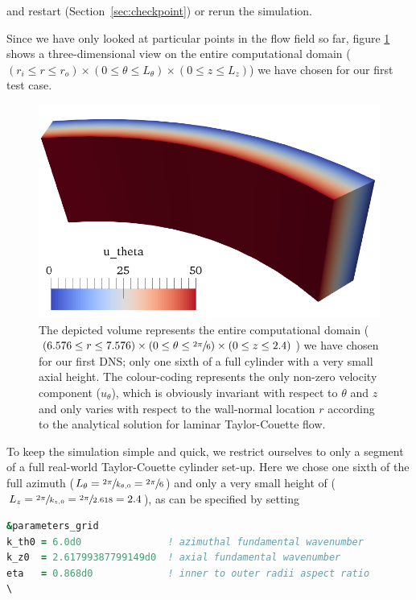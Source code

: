 \documentclass[a4paper, 11pt, DIV=11]{scrartcl}
\begin{document}
and restart (Section~\ref{sec:checkpoint}) or rerun the simulation.
\par
Since we have only looked at particular points in the flow field so far,
figure \ref{fig:tc0040laminarTaylorCouette} shows a three-dimensional
view on the entire computational domain ($(r_{i}\le r\le r_{o}) \times
(\num{0}\le\theta\le L_{\theta}) \times (\num{0}\le z\le L_{z})$) we have
chosen for our first test case.
\begin{figure}[htb]
\centering
\includegraphics[width=1.00\textwidth]{figures/tc0040/laminarTaylorCouette.png}
\caption{The depicted volume represents the entire computational domain
($(\num{6.576}\le r\le\num{7.576}) \times (\num{0}\le\theta\le\sfrac{2\pi}{6})
\times (\num{0}\le z\le\num{2.4})$) we have chosen for our first DNS; \ie only
one sixth of a full cylinder with a very small axial height. The colour-coding
represents the only non-zero velocity component ($u_{\theta}$), which is
obviously invariant with respect to $\theta$ and $z$ and only varies with
respect to the wall-normal location $r$ according to the analytical solution
for laminar Taylor-Couette flow.}
\label{fig:tc0040laminarTaylorCouette}
\end{figure}
To keep the simulation simple and quick, we restrict ourselves to only a segment of
a full real-world Taylor-Couette cylinder set-up. Here we chose one sixth of the
full azimuth ($L_{\theta}=\sfrac{2\pi}{k_{\theta,0}}=\sfrac{2\pi}{6}$) and only a
very small height of ($L_{z}=\sfrac{2\pi}{k_{z,0}}=\sfrac{2\pi}{2.618}=\num{2.4}$),
as can be specified by setting
\begin{lstlisting}[language=Fortran]
&parameters_grid
k_th0 = 6.0d0               ! azimuthal fundamental wavenumber
k_z0  = 2.61799387799149d0  ! axial fundamental wavenumber
eta   = 0.868d0             ! inner to outer radii aspect ratio
\
\end{lstlisting}
\end{document}

